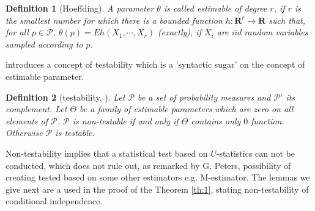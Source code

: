 \documentclass{article}
\newtheorem{definition}{Definition}
\begin{document}
\begin{definition}[Hoeffding]
A parameter  $\theta$ is called estimable of degree $r$, if $r$ is the smallest number for which there is a bounded function $h : \mathbf R^{r} \to \mathbf R$ such that, for all $p \in \mathcal P$, $ \theta(p) = Eh(X_1, \cdots , X_r)$ (exactly),  if $X_i$ are iid random variables sampled according to $p$.
\end{definition}

\cite{bergsma2004testing} introduces a concept of testability which is a 'syntactic sugar' on the concept of estimable parameter.

\begin{definition}[testability, \cite{bergsma2004testing}]
 Let $\mathcal{P}$ be a set of probability measures and $\mathcal{P}'$ its complement. Let $\Theta$ be a family of  estimable parameters which are zero on all elements of $\mathcal{P}$.  $\mathcal{P}$ is non-testable if and only if $\Theta$ contains only $0$ function. Otherwise $\mathcal{P}$ is testable. 
\end{definition}



Non-testability implies that a statistical test based on $U$-statistics can not be conducted, which does not rule out, as remarked by G. Peters, possibility of creating tested based on some other estimators e.g. M-estimator. The lemmas we give next are a used in the proof of the Theorem  \ref{th:1}, stating non-testability of conditional independence. 
\end{document}
